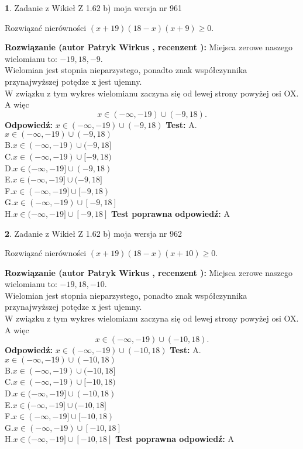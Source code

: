 \documentclass[12pt, a4paper]{article}
\theoremstyle{definition} %
\newtheorem{zad}{}
\newcommand{\zadStart}[1]{\begin{zad}#1\newline}
\newcommand{\zadStop}{\end{zad}}
\newcommand{\rozwStart}[2]{\noindent \textbf{Rozwiązanie (autor #1 , recenzent #2): }\newline}
\newcommand{\rozwStop}{\newline}
\newcommand{\odpStart}{\noindent \textbf{Odpowiedź:}\newline}
\newcommand{\odpStop}{\newline}
\newcommand{\testStart}{\noindent \textbf{Test:}\newline}
\newcommand{\testStop}{\newline}
\newcommand{\kluczStart}{\noindent \textbf{Test poprawna odpowiedź:}\newline}
\newcommand{\kluczStop}{\newline}
\begin{document}
\zadStart{Zadanie z Wikieł Z 1.62 b) moja wersja nr 961}

Rozwiązać nierówności $(x+19)(18-x)(x+9)\ge0$.
\zadStop
\rozwStart{Patryk Wirkus}{}
Miejsca zerowe naszego wielomianu to: $-19, 18, -9$.\\
Wielomian jest stopnia nieparzystego, ponadto znak współczynnika przy\linebreak najwyższej potędze x jest ujemny.\\ W związku z tym wykres wielomianu zaczyna się od lewej strony powyżej osi OX. A więc $$x \in (-\infty,-19) \cup (-9,18).$$
\rozwStop
\odpStart
$x \in (-\infty,-19) \cup (-9,18)$
\odpStop
\testStart
A.$x \in (-\infty,-19) \cup (-9,18)$\\
B.$x \in (-\infty,-19) \cup (-9,18]$\\
C.$x \in (-\infty,-19) \cup [-9,18)$\\
D.$x \in (-\infty,-19] \cup (-9,18)$\\
E.$x \in (-\infty,-19] \cup (-9,18]$\\
F.$x \in (-\infty,-19] \cup [-9,18)$\\
G.$x \in (-\infty,-19) \cup [-9,18]$\\
H.$x \in (-\infty,-19] \cup [-9,18]$
\testStop
\kluczStart
A
\kluczStop



\zadStart{Zadanie z Wikieł Z 1.62 b) moja wersja nr 962}

Rozwiązać nierówności $(x+19)(18-x)(x+10)\ge0$.
\zadStop
\rozwStart{Patryk Wirkus}{}
Miejsca zerowe naszego wielomianu to: $-19, 18, -10$.\\
Wielomian jest stopnia nieparzystego, ponadto znak współczynnika przy\linebreak najwyższej potędze x jest ujemny.\\ W związku z tym wykres wielomianu zaczyna się od lewej strony powyżej osi OX. A więc $$x \in (-\infty,-19) \cup (-10,18).$$
\rozwStop
\odpStart
$x \in (-\infty,-19) \cup (-10,18)$
\odpStop
\testStart
A.$x \in (-\infty,-19) \cup (-10,18)$\\
B.$x \in (-\infty,-19) \cup (-10,18]$\\
C.$x \in (-\infty,-19) \cup [-10,18)$\\
D.$x \in (-\infty,-19] \cup (-10,18)$\\
E.$x \in (-\infty,-19] \cup (-10,18]$\\
F.$x \in (-\infty,-19] \cup [-10,18)$\\
G.$x \in (-\infty,-19) \cup [-10,18]$\\
H.$x \in (-\infty,-19] \cup [-10,18]$
\testStop
\kluczStart
A
\kluczStop
\end{document}
